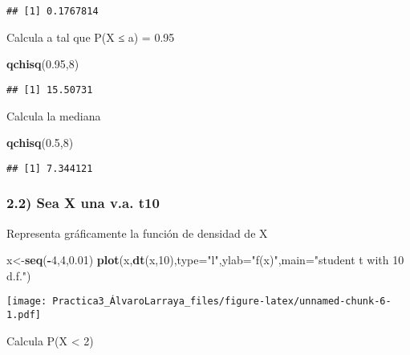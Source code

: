 \documentclass[
]{article}
\newenvironment{Shaded}{\begin{snugshade}}{\end{snugshade}}
\newcommand{\DataTypeTok}[1]{\textcolor[rgb]{0.13,0.29,0.53}{#1}}
\newcommand{\DecValTok}[1]{\textcolor[rgb]{0.00,0.00,0.81}{#1}}
\newcommand{\FloatTok}[1]{\textcolor[rgb]{0.00,0.00,0.81}{#1}}
\newcommand{\KeywordTok}[1]{\textcolor[rgb]{0.13,0.29,0.53}{\textbf{#1}}}
\newcommand{\NormalTok}[1]{#1}
\newcommand{\OperatorTok}[1]{\textcolor[rgb]{0.81,0.36,0.00}{\textbf{#1}}}
\newcommand{\StringTok}[1]{\textcolor[rgb]{0.31,0.60,0.02}{#1}}
\begin{document}
\begin{verbatim}
## [1] 0.1767814
\end{verbatim}

Calcula a tal que P(X ≤ a) = 0.95

\begin{Shaded}
\begin{Highlighting}[]
\KeywordTok{qchisq}\NormalTok{(}\FloatTok{0.95}\NormalTok{,}\DecValTok{8}\NormalTok{)}
\end{Highlighting}
\end{Shaded}

\begin{verbatim}
## [1] 15.50731
\end{verbatim}

Calcula la mediana

\begin{Shaded}
\begin{Highlighting}[]
\KeywordTok{qchisq}\NormalTok{(}\FloatTok{0.5}\NormalTok{,}\DecValTok{8}\NormalTok{)}
\end{Highlighting}
\end{Shaded}

\begin{verbatim}
## [1] 7.344121
\end{verbatim}

\hypertarget{sea-x-una-v.a.-t10}{%
\subsubsection{2.2) Sea X una v.a. t10}\label{sea-x-una-v.a.-t10}}

Representa gráficamente la función de densidad de X

\begin{Shaded}
\begin{Highlighting}[]
\NormalTok{x<-}\KeywordTok{seq}\NormalTok{(}\OperatorTok{-}\DecValTok{4}\NormalTok{,}\DecValTok{4}\NormalTok{,}\FloatTok{0.01}\NormalTok{)}
\KeywordTok{plot}\NormalTok{(x,}\KeywordTok{dt}\NormalTok{(x,}\DecValTok{10}\NormalTok{),}\DataTypeTok{type=}\StringTok{"l"}\NormalTok{,}\DataTypeTok{ylab=}\StringTok{"f(x)"}\NormalTok{,}\DataTypeTok{main=}\StringTok{"student t with 10 d.f."}\NormalTok{)}
\end{Highlighting}
\end{Shaded}

\texttt{[image: Practica3\_ÁlvaroLarraya\_files/figure-latex/unnamed-chunk-6-1.pdf]}

Calcula P(X \textless{} 2)
\end{document}
